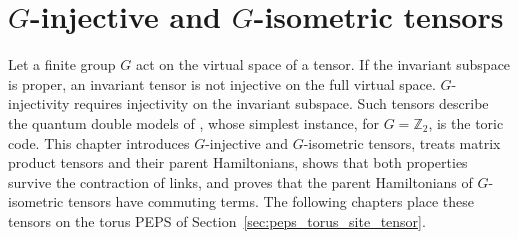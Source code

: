 
\chapter{\texorpdfstring{$G$}{G}-injective and \texorpdfstring{$G$}{G}-isometric tensors}%
\label{ch:peps_quantum_double}

Let a finite group $G$ act on the virtual space of a tensor. If the invariant
subspace is proper, an invariant tensor is not injective on the full virtual
space. $G$-injectivity requires injectivity on the invariant subspace.
Such tensors describe the quantum double models of
\cite{Kitaev2003FaultTolerant}, whose simplest instance, for
$G=\mathbb{Z}_2$, is the toric code. This chapter introduces $G$-injective
and $G$-isometric tensors, treats matrix product tensors and their parent
Hamiltonians, shows that both properties survive the contraction of links,
and proves that the parent Hamiltonians of $G$-isometric tensors have
commuting terms. The following chapters place these tensors on the torus
PEPS of Section~\ref{sec:peps_torus_site_tensor}.







